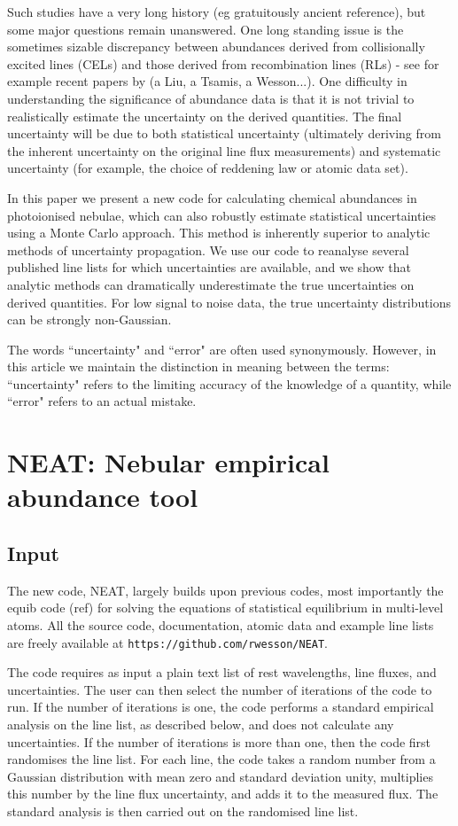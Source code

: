 \documentclass[useAMS,usenatbib]{mn2e}
\begin{document}
Such studies have a very long history (eg gratuitously ancient reference), but some major questions remain unanswered.  One long standing issue is the sometimes sizable discrepancy between abundances derived from collisionally excited lines (CELs) and those derived from recombination lines (RLs) - see for example recent papers by (a Liu, a Tsamis, a Wesson...).  One difficulty in understanding the significance of abundance data is that it is not trivial to realistically estimate the uncertainty on the derived quantities.  The final uncertainty will be due to both statistical uncertainty (ultimately deriving from the inherent uncertainty on the original line flux measurements) and systematic uncertainty (for example, the choice of reddening law or atomic data set).

In this paper we present a new code for calculating chemical abundances in photoionised nebulae, which can also robustly estimate statistical uncertainties using a Monte Carlo approach.  This method is inherently superior to analytic methods of uncertainty propagation.  We use our code to reanalyse several published line lists for which uncertainties are available, and we show that analytic methods can dramatically underestimate the true uncertainties on derived quantities.  For low signal to noise data, the true uncertainty distributions can be strongly non-Gaussian.

The words ``uncertainty" and ``error" are often used synonymously.  However, in this article we maintain the distinction in meaning between the terms: ``uncertainty" refers to the limiting accuracy of the knowledge of a quantity, while ``error" refers to an actual mistake.

\section{NEAT: Nebular empirical abundance tool}

\subsection{Input}

The new code, NEAT, largely builds upon previous codes, most importantly the {\sc equib} code (ref) for solving the equations of statistical equilibrium in multi-level atoms.  All the source code, documentation, atomic data and example line lists are freely available at \texttt{https://github.com/rwesson/NEAT}.


The code requires as input a plain text list of rest wavelengths, line fluxes, and uncertainties.  The user can then select the number of iterations of the code to run.  If the number of iterations is one, the code performs a standard empirical analysis on the line list, as described below, and does not calculate any uncertainties.  If the number of iterations is more than one, then the code first randomises the line list.  For each line, the code takes a random number from a Gaussian distribution with mean zero and standard deviation unity, multiplies this number by the line flux uncertainty, and adds it to the measured flux.  The standard analysis is then carried out on the randomised line list.
\end{document}
